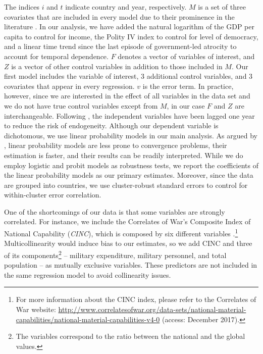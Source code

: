 The indices $i$ and $t$ indicate country and year, respectively. $M$ is a set of three covariates that are included in every model due to their prominence in the literature \citep{levine1992vale}. In our analysis, we have added the natural logarithm of the GDP per capita to control for income, the Polity IV index to control for level of democracy, and a linear time trend since the last episode of government-led atrocity to account for temporal dependence. $F$ denotes a vector of variables of interest, and $Z$ is a vector of other control variables in addition to those included in $M$. Our first model includes the variable of interest, 3 additional control variables, and 3 covariates that appear in every regression. $v$ is the error term. In practice, however, since we are interested in the effect of all variables in the data set and we do not have true control variables except from $M$, in our case $F$ and $Z$ are interchangeable. Following \citet[514]{hegre2006sensitivity}, the independent variables have been lagged one year to reduce the risk of endogeneity. Although our dependent variable is dichotomous, we use linear probability models in our main analysis. As argued by \citet[298]{gassebner2016expect}, linear probability models are less prone to convergence problems, their estimation is faster, and their results can be readily interpreted. While we do employ logistic and probit models as robustness tests, we report the coefficients of the linear probability models as our primary estimates. Moreover, since the data are grouped into countries, we use cluster-robust standard errors to control for within-cluster error correlation.
 
One of the shortcomings of our data is that some variables are strongly correlated. For instance, we include the Correlates of War's Composite Index of National Capability (\textit{CINC}), which is composed by six different variables \citep{cow2017cinc,singer1988reconstructing}.\footnote{For more information about the CINC index, please refer to the Correlates of War website: \href{http://www.correlatesofwar.org/data-sets/national-material-capabilities/national-material-capabilities-v4-0}{http://www.correlatesofwar.org/data-sets/national-material-capabilities/national-material-capabilities-v4-0} (access: December 2017).} Multicollinearity would induce bias to our estimates, so we add CINC and three of its components\footnote{The variables correspond to the ratio between the national and the global values.} -- military expenditure, military personnel, and total population -- as mutually exclusive variables. These predictors are not included in the same regression model to avoid collinearity issues.
 
